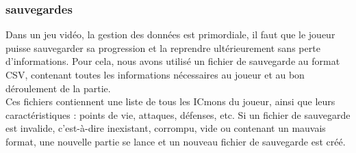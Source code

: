 \documentclass[12pt,a4paper, twoside]{article}
\begin{document}
    \subsubsection{sauvegardes}
    Dans un jeu vidéo, la gestion des données est primordiale, il faut que le joueur puisse sauvegarder sa progression et la reprendre ultérieurement sans perte d'informations.
     Pour cela, nous avons utilisé un fichier de sauvegarde au format CSV, contenant toutes les informations nécessaires au joueur et au bon déroulement de la partie.\\
     Ces fichiers contiennent une liste de tous les ICmons du joueur, ainsi que leurs caractéristiques : points de vie, attaques, défenses, etc.
     Si un fichier de sauvegarde est invalide, c'est-à-dire inexistant, corrompu, vide ou contenant un mauvais format, une nouvelle partie se lance et un nouveau fichier de sauvegarde est créé.\\
\end{document}
